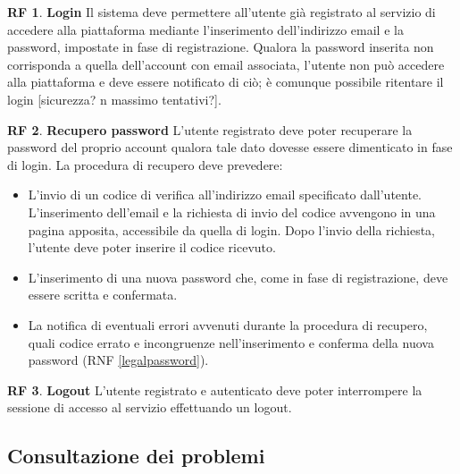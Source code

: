 \documentclass[11pt, a4paper]{article}
\theoremstyle{definition}
\newtheorem{funcreq}{RF} %
\begin{document}
\begin{funcreq}
\label{login}
\textbf{Login }
Il sistema deve permettere all'utente già registrato al servizio di
accedere alla piattaforma mediante l'inserimento dell'indirizzo
email e la password, impostate in fase di registrazione. Qualora la
password inserita non corrisponda a quella dell'account con email
associata, l'utente non può accedere alla piattaforma e deve essere
notificato di ciò; è comunque possibile ritentare il login [sicurezza?
n massimo tentativi?].
\end{funcreq}

\begin{funcreq}
\label{savepassword}
\textbf{Recupero password }
L'utente registrato deve poter recuperare la password del proprio account
qualora tale dato dovesse essere dimenticato in fase di login. La procedura
di recupero deve prevedere:
\begin{itemize}
    \item L'invio di un codice di verifica all'indirizzo email specificato
    dall'utente. L'inserimento dell'email e la richiesta di invio del
    codice avvengono in una pagina apposita, accessibile da quella di login.
    Dopo l'invio della richiesta, l'utente deve poter inserire il codice
    ricevuto.

    \item L'inserimento di una nuova password che, come in fase di registrazione,
    deve essere scritta e confermata.

    \item La notifica di eventuali errori avvenuti durante la procedura
    di recupero, quali codice errato e incongruenze nell'inserimento
    e conferma della nuova password (RNF \ref{legalpassword}).
\end{itemize}
\end{funcreq}

\begin{funcreq}
\label{logout}
\textbf{Logout }
L'utente registrato e autenticato deve poter interrompere la sessione di
accesso al servizio effettuando un logout.
\end{funcreq}

\subsection{Consultazione dei problemi}
\end{document}
